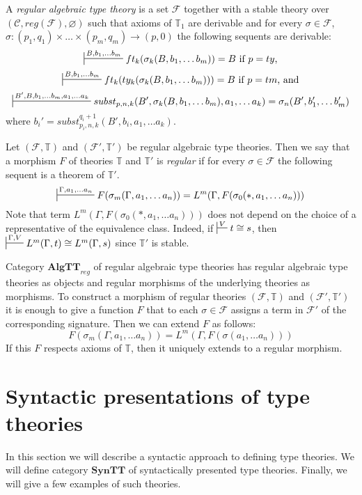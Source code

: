 \documentclass[reqno]{amsart}
\theoremstyle{definition}
\theoremstyle{remark}
\newcommand{\cat}[1]{\mathbf{#1}}
\newcommand{\syntt}{\cat{SynTT}}
\newcommand{\algtt}{\cat{AlgTT}}
\numberwithin{figure}{section}
\begin{document}
\begin{defn}
A \emph{regular algebraic type theory} is a set $\mathcal{F}$ together with a stable theory over $(\mathcal{C}, reg(\mathcal{F}), \varnothing)$
such that axioms of $\mathbb{T}_1$ are derivable and for every $\sigma \in \mathcal{F}$, $\sigma : (p_1,q_1) \times \ldots \times (p_m,q_m) \to (p,0)$ the following sequents are derivable:
\[ \sststile{}{B, b_1, \ldots b_m} ft_k(\sigma_k(B, b_1, \ldots b_m)) = B \text{ if $p = ty$,} \]
\[ \sststile{}{B, b_1, \ldots b_m} ft_k(ty_k(\sigma_k(B, b_1, \ldots b_m))) = B \text{ if $p = tm$, and} \]
\[ \sststile{}{B', B, b_1, \ldots b_m, a_1, \ldots a_k} subst_{p,n,k}(B', \sigma_k(B, b_1, \ldots b_m), a_1, \ldots a_k) = \sigma_n(B', b_1', \ldots b_m') \]
where $b_i' = subst_{p_i,n,k}^{q_i+1}(B', b_i, a_1, \ldots a_k)$.
\end{defn}

Let $(\mathcal{F},\mathbb{T})$ and $(\mathcal{F}',\mathbb{T}')$ be regular algebraic type theories.
Then we say that a morphism $F$ of theories $\mathbb{T}$ and $\mathbb{T}'$ is \emph{regular} if for every $\sigma \in \mathcal{F}$ the following sequent is a theorem of $\mathbb{T}'$.
\[ \sststile{}{\Gamma, a_1, \ldots a_n} F(\sigma_m(\Gamma, a_1, \ldots a_n)) = L^m(\Gamma, F(\sigma_0(*, a_1, \ldots a_n))) \]
Note that term $L^m(\Gamma, F(\sigma_0(*, a_1, \ldots a_n)))$ does not depend on the choice of a representative of the equivalence class.
Indeed, if $\sststile{}{V} t \cong s$, then $\sststile{}{\Gamma,V} L^m(\Gamma,t) \cong L^m(\Gamma,s)$ since $\mathbb{T}'$ is stable.

Category $\algtt_{reg}$ of regular algebraic type theories has regular algebraic type theories as objects and regular morphisms of the underlying theories as morphisms.
To construct a morphism of regular theories $(\mathcal{F},\mathbb{T})$ and $(\mathcal{F}',\mathbb{T}')$ it is enough to give a function $F$ that to each $\sigma \in \mathcal{F}$ assigns a term in $\mathcal{F}'$ of the corresponding signature.
Then we can extend $F$ as follows:
\[ F(\sigma_m(\Gamma, a_1, \ldots a_n)) = L^m(\Gamma, F(\sigma(a_1, \ldots a_n))) \]
If this $F$ respects axioms of $\mathbb{T}$, then it uniquely extends to a regular morphism.

\section{Syntactic presentations of type theories}

In this section we will describe a syntactic approach to defining type theories.
We will define category $\syntt$ of syntactically presented type theories.
Finally, we will give a few examples of such theories.
\end{document}
